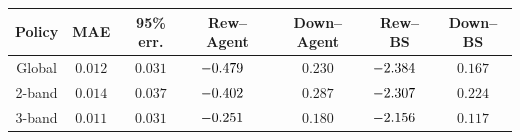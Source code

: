 \begingroup
\renewcommand{\arraystretch}{0.95}
\setlength{\tabcolsep}{3.8pt}
\begin{tabular}{@{}ccccccc@{}}
\toprule
Policy & MAE & 95\% err. & Rew--Agent & Down--Agent & Rew--BS & Down--BS \\
\midrule
Global & $0.012$ & $0.031$ & $\mathllap{-}0.479$\sym{*} & $0.230$\sym{*} & $\mathllap{-}2.384$\sym{*} & $0.167$ \\
2-band & $0.014$ & $0.037$ & $\mathllap{-}0.402$\sym{*} & $0.287$\sym{*} & $\mathllap{-}2.307$\sym{*} & $0.224$ \\
3-band & $0.011$ & $0.031$ & $\mathllap{-}0.251$ & $0.180$\sym{*} & $\mathllap{-}2.156$\sym{*} & $0.117$ \\
\bottomrule
\end{tabular}
\endgroup

